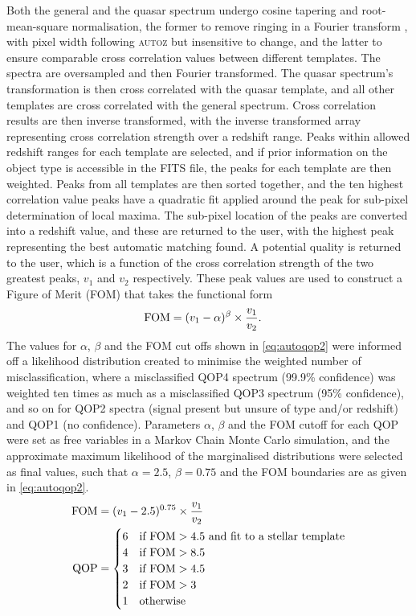 \documentclass[iop]{emulateapj}
\newcommand{\autoz}{\textsc{autoz}}
\begin{document}
Both the general and the quasar spectrum undergo cosine tapering and root-mean-square normalisation, the former to remove ringing in a Fourier transform \citep[apodization;][]{kurtz1998rvsao}, with pixel width following \autoz{} but insensitive to change, and the latter to ensure comparable cross correlation values between different templates. The spectra are oversampled and then Fourier transformed. The quasar spectrum's transformation is then cross correlated with the quasar template, and all other templates are cross correlated with the general spectrum. Cross correlation results are then inverse transformed, with the inverse transformed array representing cross correlation strength over a redshift range. Peaks within allowed redshift ranges for each template are selected, and if prior information on the object type is accessible in the FITS file, the peaks for each template are then weighted. Peaks from all templates are then sorted together, and the ten highest correlation value peaks have a quadratic fit applied around the peak for sub-pixel determination of local maxima. The sub-pixel location of the peaks are converted into a redshift value, and these are returned to the user, with the highest peak representing the best automatic matching found. A potential quality is returned to the user, which is a function of the cross correlation strength of the two greatest peaks, $v_1$ and $v_2$ respectively. These peak values are used to construct a Figure of Merit (FOM) that takes the functional form
\begin{align}
{\rm FOM} &= (v_1-\alpha)^{\beta} \times \frac{v_1}{v_2}. \label{eq:autoqop}
\end{align}
The values for $\alpha$, $\beta$ and the FOM cut offs shown in \eqref{eq:autoqop2} were informed off a likelihood distribution created to minimise the weighted number of misclassification, where a misclassified QOP4 spectrum (99.9\% confidence) was weighted ten times as much as a misclassified QOP3 spectrum (95\% confidence), and so on for QOP2 spectra (signal present but unsure of type and/or redshift) and QOP1 (no confidence). Parameters $\alpha$, $\beta$ and the FOM cutoff for each QOP were set as free variables in a Markov Chain Monte Carlo simulation, and the approximate maximum likelihood of the marginalised distributions were selected as final values, such that $\alpha = 2.5$, $\beta = 0.75$ and the FOM boundaries are as given in \eqref{eq:autoqop2}.
\begin{align}
{\rm FOM} &= (v_1-2.5)^{0.75} \times \frac{v_1}{v_2} \label{eq:autoqop3}\\
{\rm QOP} &= \begin{cases}6 & \text{if } {\rm FOM} > 4.5 \text{ and fit to a stellar template} \label{eq:autoqop2}\\
4 & \text{if } {\rm FOM} > 8.5  \\
3 & \text{if } {\rm FOM} > 4.5 \\
2 & \text{if } {\rm FOM} > 3 \\
1 & \text{otherwise} \end{cases}
\end{align}
\end{document}
